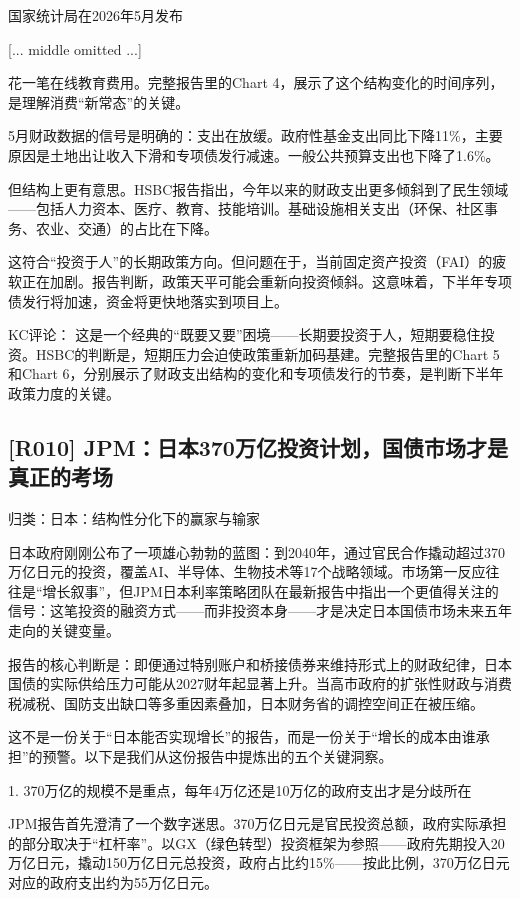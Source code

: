 \documentclass[11pt]{ctexart}
\begin{document}
国家统计局在2026年5月发布

[... middle omitted ...]

花一笔在线教育费用。完整报告里的Chart 4，展示了这个结构变化的时间序列，是理解消费“新常态”的关键。

5月财政数据的信号是明确的：支出在放缓。政府性基金支出同比下降11\%，主要原因是土地出让收入下滑和专项债发行减速。一般公共预算支出也下降了1.6\%。

但结构上更有意思。HSBC报告指出，今年以来的财政支出更多倾斜到了民生领域——包括人力资本、医疗、教育、技能培训。基础设施相关支出（环保、社区事务、农业、交通）的占比在下降。

这符合“投资于人”的长期政策方向。但问题在于，当前固定资产投资（FAI）的疲软正在加剧。报告判断，政策天平可能会重新向投资倾斜。这意味着，下半年专项债发行将加速，资金将更快地落实到项目上。

KC评论： 这是一个经典的“既要又要”困境——长期要投资于人，短期要稳住投资。HSBC的判断是，短期压力会迫使政策重新加码基建。完整报告里的Chart 5和Chart 6，分别展示了财政支出结构的变化和专项债发行的节奏，是判断下半年政策力度的关键。

\subsection{[R010] JPM：日本370万亿投资计划，国债市场才是真正的考场}
{\small\color{refgray}归类：日本：结构性分化下的赢家与输家}

日本政府刚刚公布了一项雄心勃勃的蓝图：到2040年，通过官民合作撬动超过370万亿日元的投资，覆盖AI、半导体、生物技术等17个战略领域。市场第一反应往往是“增长叙事”，但JPM日本利率策略团队在最新报告中指出一个更值得关注的信号：这笔投资的融资方式——而非投资本身——才是决定日本国债市场未来五年走向的关键变量。

报告的核心判断是：即便通过特别账户和桥接债券来维持形式上的财政纪律，日本国债的实际供给压力可能从2027财年起显著上升。当高市政府的扩张性财政与消费税减税、国防支出缺口等多重因素叠加，日本财务省的调控空间正在被压缩。

这不是一份关于“日本能否实现增长”的报告，而是一份关于“增长的成本由谁承担”的预警。以下是我们从这份报告中提炼出的五个关键洞察。

1. 370万亿的规模不是重点，每年4万亿还是10万亿的政府支出才是分歧所在

JPM报告首先澄清了一个数字迷思。370万亿日元是官民投资总额，政府实际承担的部分取决于“杠杆率”。以GX（绿色转型）投资框架为参照——政府先期投入20万亿日元，撬动150万亿日元总投资，政府占比约15\%——按此比例，370万亿日元对应的政府支出约为55万亿日元。
\end{document}
